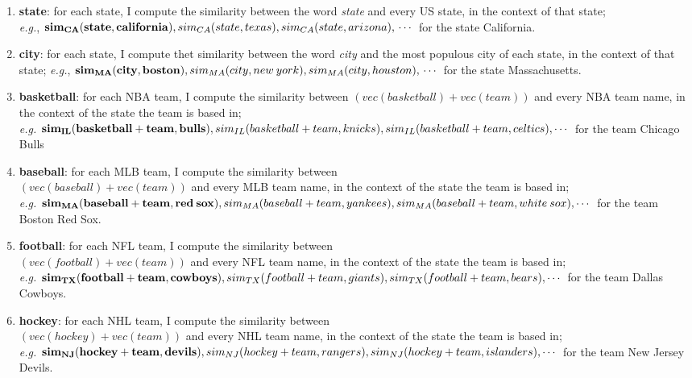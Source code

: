 \documentclass[a4paper,12pt,twoside,openright]{report}
\newcommand{\tb}{\vspace{10pt} \textbf}
\newcommand{\ti}{\textit}
\begin{document}
\begin{enumerate}[itemsep=-15pt]
	\item \tb{state}: for each state, I compute the similarity between the word \ti{state} and every US state, in the context of that state; \\ \ti{e.g.}, $\mathbf{sim_{CA}(state,california)},sim_{CA}(state, texas),sim_{CA}(state, arizona),\\ \cdots$ for the state California.
	\item \tb{city}: for each state, I compute thet similarity between the word \ti{city} and the most populous city of each state, in the context of that state; \ti{e.g.}, $\mathbf{sim_{MA}(city,boston)},sim_{MA}(city,new\:york), sim_{MA}(city,houston),\\ \cdots$ for the state Massachusetts. 
	\item \tb{basketball}: for each NBA team, I compute the similarity between $(vec(basketball)+vec(team))$ and every NBA team name, in the context of the state the team is based in; \\ \ti{e.g.} $\mathbf{sim_{IL}(basketball+team,bulls)},sim_{IL}(basketball+team,knicks),\\sim_{IL}(basketball+team,celtics), \cdots$ for the team Chicago Bulls
	\item \tb{baseball}: for each MLB team, I compute the similarity between \\ $(vec(baseball)+vec(team))$ and every MLB team name, in the context of the state the team is based in; \\ \ti{e.g.} $\mathbf{sim_{MA}(baseball+team,red\:sox)},sim_{MA}(baseball+team,yankees),\\sim_{MA}(baseball+team,white\:sox),\cdots$ for the team Boston Red Sox. 
	\item \tb{football}: for each NFL team, I compute the similarity between \\ $(vec(football)+vec(team))$ and every NFL team name, in the context of the state the team is based in; \\ \ti{e.g.} $\mathbf{sim_{TX}(football+team,cowboys)},sim_{TX}(football+team,giants),\\ sim_{TX}(football+team,bears),\cdots$ for the team Dallas Cowboys.
	\item \tb{hockey}: for each NHL team, I compute the similarity between \\ $(vec(hockey)+vec(team))$ and every NHL team name, in the context of the state the team is based in;\\  \ti{e.g.} $\mathbf{sim_{NJ}(hockey+team,devils)},sim_{NJ}(hockey+team,rangers),\\ sim_{NJ}(hockey+team,islanders),\cdots$ for the team New Jersey Devils.
\end{enumerate}
\end{document}

